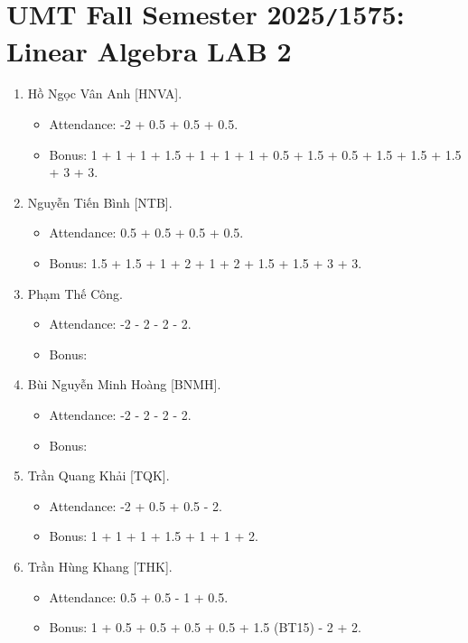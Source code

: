 \documentclass{article}
\begin{document}

\section{UMT Fall Semester 2025{\tt/}1575: Linear Algebra LAB 2}

\begin{enumerate}
    \item {\sc Hồ Ngọc Vân Anh [HNVA].}
    \begin{itemize}
        \item Attendance: -2 + 0.5 + 0.5 + 0.5.
        \item Bonus: 1 + 1 + 1 + 1.5 + 1 + 1 + 1 + 0.5 + 1.5 + 0.5 + 1.5 + 1.5 + 1.5 + 3 + 3.
    \end{itemize}
    \item {\sc Nguyễn Tiến Bình [NTB].}
    \begin{itemize}
        \item Attendance: 0.5 + 0.5 + 0.5 + 0.5.
        \item Bonus: 1.5 + 1.5 + 1 + 2 + 1 + 2 + 1.5 + 1.5 + 3 + 3.
    \end{itemize}
    \item {\sc Phạm Thế Công.}
    \begin{itemize}
        \item Attendance: -2 - 2 - 2 - 2.
        \item Bonus:
    \end{itemize}
    \item {\sc Bùi Nguyễn Minh Hoàng [BNMH].}
    \begin{itemize}
        \item Attendance: -2 - 2 - 2 - 2.
        \item Bonus:
    \end{itemize}
    \item {\sc Trần Quang Khải [TQK].}
    \begin{itemize}
        \item Attendance: -2 + 0.5 + 0.5 - 2.
        \item Bonus: 1 + 1 + 1 + 1.5 + 1 + 1 + 2.
    \end{itemize}
    \item {\sc Trần Hùng Khang [THK].}
    \begin{itemize}
        \item Attendance: 0.5 + 0.5 - 1 + 0.5.
        \item Bonus: 1 + 0.5 + 0.5 + 0.5 + 0.5 + 1.5 (BT15) - 2 + 2.

\end{itemize}
\end{enumerate}
\end{document}
